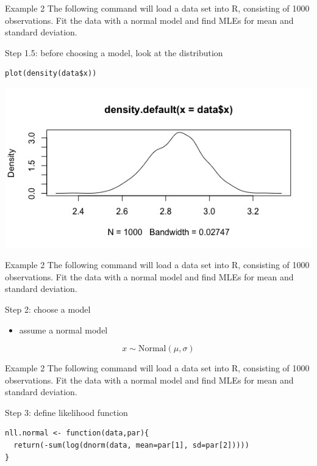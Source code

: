 \documentclass[presentation]{beamer}
\begin{document}
\begin{frame}[fragile,label=sec-19]{Example 2}
 The following command will load a data set into R, consisting of 1000 observations.  Fit the data with a normal model and find MLEs for mean and standard deviation.

\vspace{5mm}

Step 1.5: before choosing a model, look at the distribution

\begin{verbatim}
plot(density(data$x))
\end{verbatim}

\includegraphics[width=.9\linewidth]{figures/week2/normalDensity.png}
\end{frame}


\begin{frame}[label=sec-20]{Example 2}
The following command will load a data set into R, consisting of 1000 observations.  Fit the data with a normal model and find MLEs for mean and standard deviation.

\vspace{5mm}

Step 2: choose a model
\begin{itemize}
\item assume a normal model
\end{itemize}

\[
x \sim \text{Normal}(\mu,\sigma)
\]
\end{frame}


\begin{frame}[fragile,label=sec-21]{Example 2}
 The following command will load a data set into R, consisting of 1000 observations.  Fit the data with a normal model and find MLEs for mean and standard deviation.

\vspace{5mm}

Step 3: define likelihood function

\begin{verbatim}
nll.normal <- function(data,par){
  return(-sum(log(dnorm(data, mean=par[1], sd=par[2]))))
}
\end{verbatim}
\end{frame}
\end{document}
